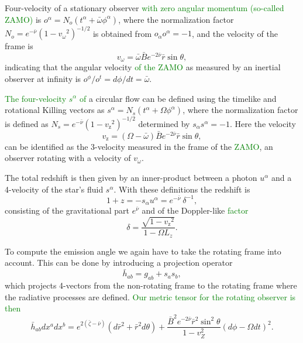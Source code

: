 \documentclass{aa}
\newcommand{\be}{\begin{equation}}
\newcommand{\ee}{\end{equation}}
\newcommand{\refe}[1]{\textcolor{green}{{#1}}}
\newcommand{\rb}{\ensuremath{\bar{r}}}
\newcommand{\wb}{\ensuremath{\bar{\omega}}}
\newcommand{\nub}{\ensuremath{\bar{\nu}}}
\newcommand{\zetab}{\ensuremath{\bar{\zeta}}}
\newcommand{\Bb}{\ensuremath{\bar{B}}}
\newcommand{\vw}{\ensuremath{v_{\omega}}}
\newcommand{\vz}{\ensuremath{v_{\mathrm{z}}}}
\begin{document}
Four-velocity of a stationary observer \refe{with zero angular momentum (so-called ZAMO)} is $o^{\alpha} = N_o (t^{\alpha} + \wb \phi^{\alpha})$, where the normalization factor $N_o = e^{-\nub}(1-\vw^2)^{-1/2}$ is obtained from $o_{\alpha}o^{\alpha} = -1$, and the velocity of the frame is 
\be
\vw = \wb \Bb e^{-2\nub} \rb \sin\theta,
\ee
indicating that the angular velocity \refe{of the ZAMO} as measured by an inertial observer at infinity is $o^{\phi} / o^{t} = d\phi/dt = \wb$.

\refe{The four-velocity $s^{\alpha}$ of} a circular flow can be defined using the timelike and rotational Killing vectors as $s^{\alpha} = N_s (t^{\alpha} + \Omega \phi^{\alpha})$, where the normalization factor is defined as $N_s = e^{-\nub} (1 - \vz^2)^{-1/2}$ determined by $s_{\alpha}s^{\alpha} = -1$.
Here the velocity 
\be
\vz = (\Omega - \wb) \Bb e^{-2\nub} \rb \sin\theta,
\ee
can be identified as the 3-velocity measured in the frame of the \refe{ZAMO}, an observer rotating with a velocity of $\vw$.

The total redshift is then given by an inner-product between a photon $u^{\alpha}$ and a 4-velocity of the star's fluid $s^{\alpha}$.
With these definitions the redshift is
\be\label{eq:redshift}
1 + z = -s_{\alpha} u^{\alpha} = e^{-\nub} ~\delta^{-1},
\ee
consisting of the gravitational part $e^{\nub}$ and of the Doppler-like \refe{factor}
\be
\delta = \frac{\sqrt{1-\vz^2}}{1 - \Omega L_z}.
\ee

To compute the emission angle we again have to take the rotating frame into account.  
This can be done by introducing a projection operator 
\be
\bar{h}_{ab} = g_{ab} + s_a s_b, 
\ee
which projects 4-vectors from the non-rotating frame to the rotating frame where the radiative processes are defined.  
\refe{Our metric tensor for the rotating observer is then}
\be\label{eq:proj}
\bar{h}_{ab} dx^a dx^b = e^{2(\zetab - \nub)} (d\rb^2 + \rb^2 d\theta) + \frac{\Bb^2 e^{-2\nub} \rb^2 \sin^2\theta}{1-v_Z^2} (d\phi - \Omega dt)^2.
\ee
\end{document}
